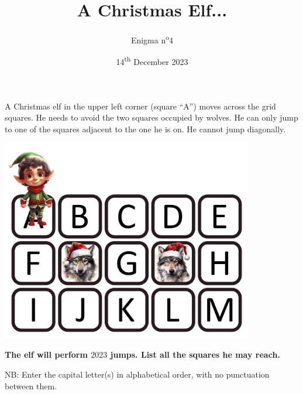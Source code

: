 \documentclass[a4paper, top=10mm]{article}
\title{\textbf{\huge{A Christmas Elf...}}}
\author{Enigma n\textsuperscript{o}4}
\date{14\textsuperscript{th} December 2023}
\begin{document}
	\maketitle
	
	A Christmas elf in the upper left corner (square “A”) moves across the grid squares.
	He needs to avoid the two squares occupied by wolves.
	He can only jump to one of the squares adjacent to the one he is on.
	He cannot jump diagonally.
	
	\begin{center}
		\includegraphics[height=250pt]{04map.png}\\
	\end{center}
	
	\textbf{The elf will perform $2023$ jumps.
	List all the squares he may reach.}
	
	NB: Enter the capital letter(s) in alphabetical order, with no punctuation between them.
	
	
\end{document}
